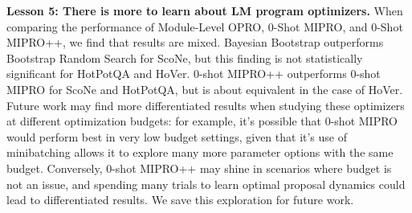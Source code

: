 \textbf{Lesson 5: There is more to learn about LM program optimizers.} When comparing the performance of Module-Level OPRO, 0-Shot MIPRO, and 0-Shot MIPRO++, we find that results are mixed. Bayesian Bootstrap outperforms Bootstrap Random Search for ScoNe, but this finding is not statistically significant for HotPotQA and HoVer. 0-shot MIPRO++ outperforms 0-shot MIPRO for ScoNe and HotPotQA, but is about equivalent in the case of HoVer. Future work may find more differentiated results when studying these optimizers at different optimization budgets: for example, it's possible that 0-shot MIPRO would perform best in very low budget settings, given that it's use of minibatching allows it to explore many more parameter options with the same budget. Conversely, 0-shot MIPRO++ may shine in scenarios where budget is not an issue, and spending many trials to learn optimal proposal dynamics could lead to differentiated results. We save this exploration for future work.



























